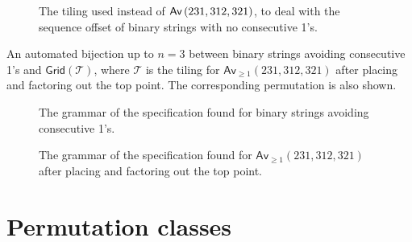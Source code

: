 \begin{figure}[ht!]
    \centering
    
    \caption{The tiling used instead of $\textsf{Av}\left(231,312,321\right)$, to deal with the sequence offset of binary strings with no consecutive 1's.}
    \label{fig:fibpermoffbyone}
\end{figure}

\begin{table}[ht!]
    \centering
    
    \caption{An automated bijection up to $n=3$ between binary strings avoiding consecutive 1's and $\textsf{Grid}(\mathcal{T})$, where $\mathcal{T}$ is the tiling for $\textsf{Av}_{\geq1}(231,312,321)$ after placing and factoring out the top point. The corresponding permutation is also shown.}
    \label{tab:wordtilmap}
\end{table}

\begin{figure}
    \centering
    
    \vspace*{-12.5mm}
    \caption{The grammar of the specification found for binary strings avoiding consecutive 1's.}
    \label{fig:fibwordtree}
\end{figure}
\begin{figure}
    \centering
    
    \vspace*{-14mm}
    \caption{The grammar of the specification found for $\textsf{Av}_{\geq1}(231,312,321)$ after placing and factoring out the top point.}
    \label{fig:fibpermtree}
\end{figure}

\section{Permutation classes}
